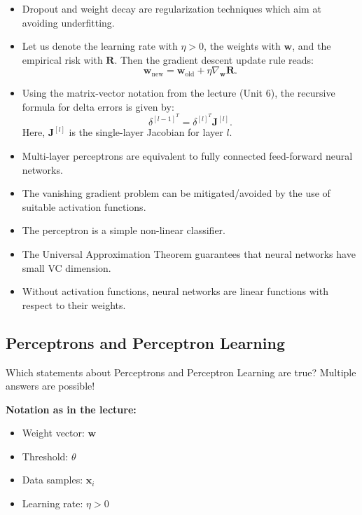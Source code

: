 \documentclass{article}
\begin{document}
\begin{itemize}
    \item[(a)] Dropout and weight decay are regularization techniques which aim at avoiding underfitting.
    \item[(b)] Let us denote the learning rate with \(\eta > 0\), the weights with \(\mathbf{w}\), and the empirical risk with \(\mathbf{R}\). Then the gradient descent update rule reads: 
    \[
    \mathbf{w}_{\text{new}} = \mathbf{w}_{\text{old}} + \eta \nabla_{\mathbf{w}} \mathbf{R}.
    \]
    \item[(c)] Using the matrix-vector notation from the lecture (Unit 6), the recursive formula for delta errors is given by:
    \[
    \delta^{[l-1]^T} = \delta^{[l]^T} \mathbf{J}^{[l]}.
    \]
    Here, \(\mathbf{J}^{[l]}\) is the single-layer Jacobian for layer \(l\).
    \item[(d)] Multi-layer perceptrons are equivalent to fully connected feed-forward neural networks.
    \item[(e)] The vanishing gradient problem can be mitigated/avoided by the use of suitable activation functions.
    \item[(f)] The perceptron is a simple non-linear classifier.
    \item[(g)] The Universal Approximation Theorem guarantees that neural networks have small VC dimension.
    \item[(h)] Without activation functions, neural networks are linear functions with respect to their weights.
\end{itemize}

\subsection*{Perceptrons and Perceptron Learning}

Which statements about Perceptrons and Perceptron Learning are true? Multiple answers are possible!

\textbf{Notation as in the lecture:}
\begin{itemize}
    \item Weight vector: \(\mathbf{w}\)
    \item Threshold: \(\theta\)
    \item Data samples: \(\mathbf{x}_i\)
    \item Learning rate: \(\eta > 0\)
\end{itemize}
\end{document}
